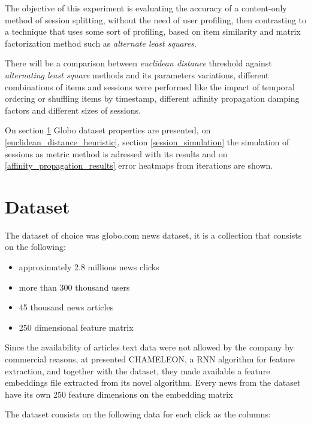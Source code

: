 \documentclass[ecp,tc,english]{iiufrgs}
\begin{document}
    
    The objective of this experiment is evaluating the accuracy of a content-only method of session splitting, without the need of user profiling, then contrasting to a technique that uses some sort of profiling, based on item similarity and matrix factorization method such as \textit{alternate least squares}.
    
    There will be a comparison between \textit{euclidean distance} threshold against \textit{alternating least square} methods and its parameters variations, different combinations of items and sessions were performed like the impact of temporal ordering or shuffling items by timestamp, different affinity propagation damping factors and different sizes of sessions.
    
    On section \ref{globo_dot_com_dataset} Globo dataset properties are presented, on \ref{euclidean_distance_heuristic}, section \ref{session_simulation} the simulation of sessions as metric method is adressed with its results and on \ref{affinity_propagation_results} error heatmaps from iterations are shown.

    \section{Dataset} \label{globo_dot_com_dataset}
    The dataset of choice was globo.com news dataset, it is a collection that consists on the following:
    \begin{itemize}
        \item approximately 2.8 millions news clicks
        \item more than 300 thousand users
        \item 45 thousand news articles
        \item 250 dimensional feature matrix
    \end{itemize}
    
    Since the availability of articles text data were not allowed by the company by commercial reasons, at \cite{moreira2018chameleon} presented CHAMELEON, a RNN algorithm for feature extraction, and together with the dataset, they made available a feature embeddings file extracted from its novel algorithm. Every news from the dataset have its own 250 feature dimensions on the embedding matrix
    
    The dataset consists on the following data for each click as the columns:
    
\end{document}
